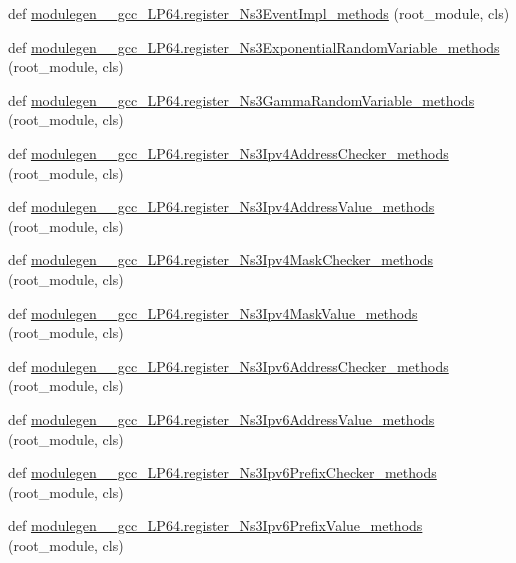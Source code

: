 \begin{DoxyCompactItemize}
\item 
def \hyperlink{namespacemodulegen____gcc__LP64_af4f20b1c5907e07b645fc3d57c733d1a}{modulegen\+\_\+\+\_\+gcc\+\_\+\+L\+P64.\+register\+\_\+\+Ns3\+Event\+Impl\+\_\+methods} (root\+\_\+module, cls)
\item 
def \hyperlink{namespacemodulegen____gcc__LP64_ab62699a984e734ed1c1a4081daa0111d}{modulegen\+\_\+\+\_\+gcc\+\_\+\+L\+P64.\+register\+\_\+\+Ns3\+Exponential\+Random\+Variable\+\_\+methods} (root\+\_\+module, cls)
\item 
def \hyperlink{namespacemodulegen____gcc__LP64_afc8093c1b272f8c4c4280ae9730cc32c}{modulegen\+\_\+\+\_\+gcc\+\_\+\+L\+P64.\+register\+\_\+\+Ns3\+Gamma\+Random\+Variable\+\_\+methods} (root\+\_\+module, cls)
\item 
def \hyperlink{namespacemodulegen____gcc__LP64_adc0fd34fe5054bad708a40699ec19c68}{modulegen\+\_\+\+\_\+gcc\+\_\+\+L\+P64.\+register\+\_\+\+Ns3\+Ipv4\+Address\+Checker\+\_\+methods} (root\+\_\+module, cls)
\item 
def \hyperlink{namespacemodulegen____gcc__LP64_a790c617791e5a0c735de031e06684232}{modulegen\+\_\+\+\_\+gcc\+\_\+\+L\+P64.\+register\+\_\+\+Ns3\+Ipv4\+Address\+Value\+\_\+methods} (root\+\_\+module, cls)
\item 
def \hyperlink{namespacemodulegen____gcc__LP64_a2a6820145ab3bf977a66f5c0ee7f5cb9}{modulegen\+\_\+\+\_\+gcc\+\_\+\+L\+P64.\+register\+\_\+\+Ns3\+Ipv4\+Mask\+Checker\+\_\+methods} (root\+\_\+module, cls)
\item 
def \hyperlink{namespacemodulegen____gcc__LP64_abcaf7e9c479182a07e377ce5e986a998}{modulegen\+\_\+\+\_\+gcc\+\_\+\+L\+P64.\+register\+\_\+\+Ns3\+Ipv4\+Mask\+Value\+\_\+methods} (root\+\_\+module, cls)
\item 
def \hyperlink{namespacemodulegen____gcc__LP64_ad1f9cec8b591983bb09444b16062156d}{modulegen\+\_\+\+\_\+gcc\+\_\+\+L\+P64.\+register\+\_\+\+Ns3\+Ipv6\+Address\+Checker\+\_\+methods} (root\+\_\+module, cls)
\item 
def \hyperlink{namespacemodulegen____gcc__LP64_ab829e3fded47f86a33a84e69215707ca}{modulegen\+\_\+\+\_\+gcc\+\_\+\+L\+P64.\+register\+\_\+\+Ns3\+Ipv6\+Address\+Value\+\_\+methods} (root\+\_\+module, cls)
\item 
def \hyperlink{namespacemodulegen____gcc__LP64_ab45b7cad858b5fb8fd4921640270716f}{modulegen\+\_\+\+\_\+gcc\+\_\+\+L\+P64.\+register\+\_\+\+Ns3\+Ipv6\+Prefix\+Checker\+\_\+methods} (root\+\_\+module, cls)
\item 
def \hyperlink{namespacemodulegen____gcc__LP64_a24017f7931b685270f9f9cae9dbc1f2e}{modulegen\+\_\+\+\_\+gcc\+\_\+\+L\+P64.\+register\+\_\+\+Ns3\+Ipv6\+Prefix\+Value\+\_\+methods} (root\+\_\+module, cls)

\end{DoxyCompactItemize}
